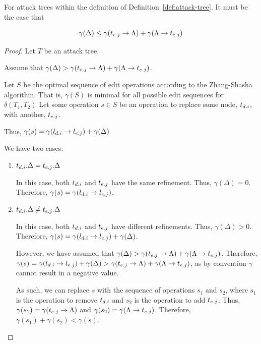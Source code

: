 \begin{lemma}\label{lem:gamma-delta-2}
    For attack trees within the definition of Definition~\ref{def:attack-tree}. It must be the case that

    \[\gamma(\Delta) \le \gamma(t_{{e}.{j}} \rightarrow {\Lambda}) + \gamma(\Lambda \rightarrow {t_{{e}.{j}}})\]

    \begin{proof}
        Let $T$ be an attack tree.

        Assume that $\gamma(\Delta) > \gamma(t_{{e}.{j}} \rightarrow {\Lambda}) + \gamma(\Lambda \rightarrow {t_{{e}.{j}}})$.

        Let $S$ be the optimal sequence of edit operations according to the Zhang-Shasha algorithm. That is, $\gamma(S)$ is minimal for all possible edit sequences for $\delta(T_1, T_2)$ Let some operation $s \in S$ be an operation to replace some node, $t_{{d}.{i}}$, with another, $t_{{e}.{j}}$.

        Thus, $\gamma(s) = \gamma({l_{{d}.{i}}} \rightarrow {l_{{e}.{j}}}) + \gamma(\Delta)$

        We have two cases:

        \begin{enumerate}
            \item $t_{{d}.{i}}.\Delta = t_{{e}.{j}}.\Delta$

                  In this case, both $t_{{d}.{i}}$ and $t_{{e}.{j}}$ have the same refinement. Thus, $\gamma(\Delta) = 0$. Therefore, $\gamma(s) = \gamma({l_{{d}.{i}}} \rightarrow {l_{{e}.{j}}})$.

            \item $t_{{d}.{i}}.\Delta \ne t_{{e}.{j}}.\Delta$

                  In this case, both $t_{{d}.{i}}$ and $t_{{e}.{j}}$ have different refinements. Thus, $\gamma(\Delta) > 0$. Therefore, $\gamma(s) = \gamma({l_{{d}.{i}}} \rightarrow {l_{{e}.{j}}}) + \gamma(\Delta)$.

                  However, we have assumed that $\gamma(\Delta) > \gamma(t_{{e}.{j}} \rightarrow {\Lambda}) + \gamma(\Lambda \rightarrow {t_{{e}.{j}}})$. Therefore, $\gamma(s) = \gamma({l_{{d}.{i}}} \rightarrow {l_{{e}.{j}}}) + \gamma(\Delta) > \gamma(t_{{e}.{j}} \rightarrow {\Lambda}) + \gamma(\Lambda \rightarrow {t_{{e}.{j}}})$, as by convention $\gamma$ cannot result in a negative value.

                  As such, we can replace $s$ with the sequence of operations $s_1$ and $s_2$, where $s_1$ is the operation to remove $t_{{d}.{i}}$ and $s_2$ is the operation to add $t_{{e}.{j}}$. Thus, $\gamma(s_1) = \gamma(t_{{e}.{j}} \rightarrow {\Lambda})$ and $\gamma(s_2) = \gamma(\Lambda \rightarrow {t_{{e}.{j}}})$. Therefore, $\gamma(s_1) + \gamma(s_2) < \gamma(s)$.


\end{enumerate}
\end{proof}
\end{lemma}
